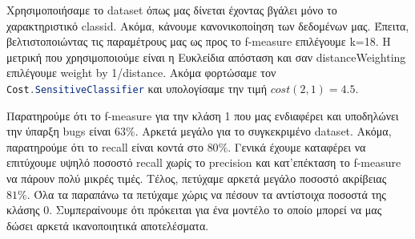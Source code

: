 Χρησιμοποιήσαμε το dataset όπως μας δίνεται έχοντας βγάλει μόνο το χαρακτηριστικό classid.
Ακόμα, κάνουμε κανονικοποίηση των δεδομένων μας.
Έπειτα, βελτιστοποιώντας τις παραμέτρους μας ως προς το f-measure επιλέγουμε k=18.
Η μετρική που χρησιμοποιούμε είναι η Ευκλείδια απόσταση και σαν distanceWeighting επιλέγουμε weight by 1/distance.
Ακόμα φορτώσαμε τον
\lstinline[language=Java]!Cost.SensitiveClassifier!
και υπολογίσαμε την τιμή $cost(2,1)=4.5$.

Παρατηρούμε ότι το f-measure για την κλάση 1 που μας ενδιαφέρει και υποδηλώνει την ύπαρξη bugs είναι $63\%$.
Αρκετά μεγάλο για το συγκεκριμένο dataset.
Ακόμα, παρατηρούμε ότι το recall είναι κοντά στο $80\%$.
Γενικά έχουμε καταφέρει να επιτύχουμε υψηλό ποσοστό recall χωρίς το precision και κατ'επέκταση το f-measure να πάρουν πολύ μικρές τιμές.
Τέλος, πετύχαμε αρκετά μεγάλο ποσοστό ακρίβειας $81\%$.
Όλα τα παραπάνω τα πετύχαμε χώρις να πέσουν τα αντίστοιχα ποσοστά της κλάσης 0.
Συμπεραίνουμε ότι πρόκειται για ένα μοντέλο το οποίο μπορεί να μας δώσει αρκετά ικανοποιητικά αποτελέσματα.